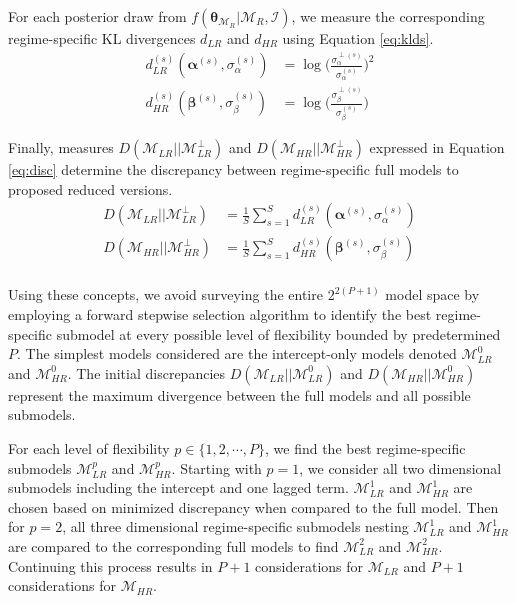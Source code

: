 For each posterior draw from $f(\bm{\theta}_{\mathcal{M}_R}|\mathcal{M}_{R},\mathcal{I})$, we measure the corresponding regime-specific KL divergences $d_{LR}$ and $d_{HR}$ using Equation \ref{eq:klds}.
\begin{equation}
\label{eq:klds}
\begin{split}
d^{(s)}_{LR}(\bm{\alpha}^{(s)},\sigma^{(s)}_\alpha)&=\log\bigg(\frac{\sigma^{\perp(s)}_\alpha}{\sigma^{(s)}_\alpha}\bigg)^2\\
d^{(s)}_{HR}(\bm{\beta}^{(s)},\sigma^{(s)}_\beta)&=\log\bigg(\frac{\sigma^{\perp(s)}_\beta}{\sigma^{(s)}_\beta}\bigg)
\end{split}
\end{equation}

Finally, measures $D(\mathcal{M}_{LR}||\mathcal{M}^\perp_{LR})$ and $D(\mathcal{M}_{HR}||\mathcal{M}^\perp_{HR})$ expressed in Equation \ref{eq:disc} determine the discrepancy between regime-specific full models to proposed reduced versions. 
\begin{equation}
\label{eq:disc}
\begin{split}
D(\mathcal{M}_{LR}||\mathcal{M}^\perp_{LR})&=\frac{1}{S}\sum\limits^S_{s=1} d^{(s)}_{LR}(\bm{\alpha}^{(s)},\sigma^{(s)}_\alpha)    \\
D(\mathcal{M}_{HR}||\mathcal{M}^\perp_{HR})&=\frac{1}{S}\sum\limits^S_{s=1} d^{(s)}_{HR}(\bm{\beta}^{(s)},\sigma^{(s)}_\beta)     \\
\end{split}
\end{equation}

Using these concepts, we avoid surveying the entire  $2^{2(P+1)}$ model space by employing a forward stepwise selection algorithm to identify the best regime-specific submodel at every possible level of flexibility bounded by predetermined $P$. The simplest models considered are the intercept-only models denoted $\mathcal{M}^0_{LR}$ and $\mathcal{M}^0_{HR}$. The initial discrepancies  $D(\mathcal{M}_{LR}||\mathcal{M}^0_{LR})$ and $D(\mathcal{M}_{HR}||\mathcal{M}^0_{HR})$ represent the maximum divergence between the full models and all possible submodels. 

For each level of flexibility $p \in \{1,2,\cdots,P\}$, we find the best regime-specific submodels $\mathcal{M}^p_{LR}$ and $\mathcal{M}^p_{HR}$. Starting with $p=1$, we consider all two dimensional submodels including the intercept and one lagged term. $\mathcal{M}^1_{LR}$ and $\mathcal{M}^1_{HR}$ are chosen based on minimized discrepancy when compared to the full model. Then for $p=2$, all three dimensional regime-specific submodels nesting $\mathcal{M}^1_{LR}$ and $\mathcal{M}^1_{HR}$ are compared to the corresponding full models to find $\mathcal{M}^2_{LR}$ and $\mathcal{M}^2_{HR}$. Continuing this process results in $P+1$ considerations for $\mathcal{M}_{LR}$ and $P+1$ considerations for $\mathcal{M}_{HR}$. 

